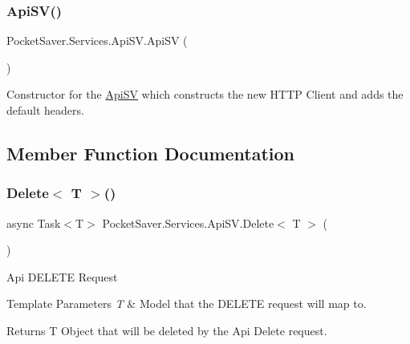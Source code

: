 \subsubsection{\texorpdfstring{Api\+S\+V()}{ApiSV()}}
{\footnotesize\ttfamily Pocket\+Saver.\+Services.\+Api\+S\+V.\+Api\+SV (\begin{DoxyParamCaption}{ }\end{DoxyParamCaption})\hspace{0.3cm}{\ttfamily [inline]}}



Constructor for the \hyperlink{class_pocket_saver_1_1_services_1_1_api_s_v}{Api\+SV} which constructs the new H\+T\+TP Client and adds the default headers. 



\subsection{Member Function Documentation}
\mbox{\label{class_pocket_saver_1_1_services_1_1_api_s_v_a1a4b1d8cc442dc1bcb908ff2ae7b243f}} 
\subsubsection{\texorpdfstring{Delete$<$ T $>$()}{Delete< T >()}}
{\footnotesize\ttfamily async Task$<$T$>$ Pocket\+Saver.\+Services.\+Api\+S\+V.\+Delete$<$ T $>$ (\begin{DoxyParamCaption}{ }\end{DoxyParamCaption})\hspace{0.3cm}{\ttfamily [inline]}}



Api D\+E\+L\+E\+TE Request 


\begin{DoxyTemplParams}{Template Parameters}
{\em T} & Model that the D\+E\+L\+E\+TE request will map to.\\
\hline
\end{DoxyTemplParams}
\begin{DoxyReturn}{Returns}
T Object that will be deleted by the Api Delete request.
\end{DoxyReturn}
\mbox{\label{class_pocket_saver_1_1_services_1_1_api_s_v_af0ad1db31c39565bc5e46d7ef1985fbb}} 
